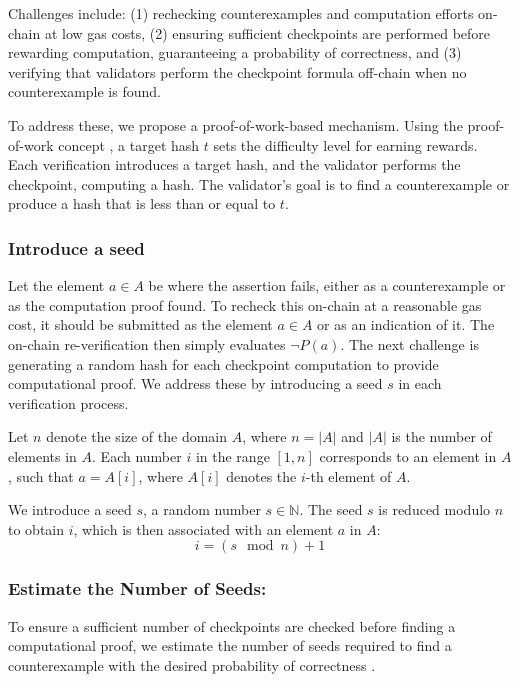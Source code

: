 \documentclass[runningheads]{llncs}
\begin{document}
Challenges include: (1) rechecking counterexamples and computation efforts on-chain at low gas costs, (2) ensuring sufficient checkpoints are performed before rewarding computation, guaranteeing a probability of correctness, and (3) verifying that validators perform the checkpoint formula off-chain when no counterexample is found.

To address these, we propose a proof-of-work-based mechanism. Using the proof-of-work concept \cite{dwork1992pow,nakamoto2008bitcoin}, a target hash \( t \) sets the difficulty level for earning rewards. Each verification introduces a target hash, and the validator performs the checkpoint, computing a hash. The validator’s goal is to find a counterexample or produce a hash  that is less than or equal to \( t \).
\subsubsection{Introduce a seed} 
Let the element \( a \in A \) be where the assertion fails, either as a counterexample or as the computation proof found. To recheck this on-chain at a reasonable gas cost, it should be submitted as the element \( a \in A \) or as an indication of it. The on-chain re-verification then simply evaluates \( \neg P(a) \). The next challenge is generating a random hash for each checkpoint computation to provide computational proof. We address these by introducing a seed \( s \) in each verification process.


Let \( n \) denote the size of the domain \( A \), where \( n = |A| \) and \(|A|\) is the number of elements in \( A \). Each number \( i \) in the range \([1, n]\) corresponds to an element in \( A \), such that \( a = A[i] \), where \( A[i] \) denotes the \( i \)-th element of \( A \).

We introduce a seed \( s \), a random number \( s \in \mathbb{N} \). The seed \( s \) is reduced modulo \( n \) to obtain \( i \), which is then associated with an element \( a \) in \( A \):
\begin{equation}
\label{eq:11}
i = (s \mod n) + 1
\end{equation}
\subsubsection{Estimate the Number of Seeds:} To ensure a sufficient number of checkpoints are checked before finding a computational proof, we estimate the number of seeds required to find a counterexample with the desired probability of correctness \cite{ross2014probability,feller1968probability}.
\end{document}
